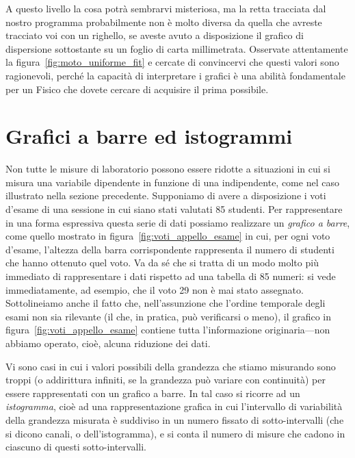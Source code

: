 A questo livello la cosa potrà sembrarvi misteriosa, ma la retta tracciata
dal nostro programma probabilmente non è molto diversa da quella che avreste
tracciato voi con un righello, se aveste avuto a disposizione il grafico di
dispersione sottostante su un foglio di carta millimetrata.
Osservate attentamente la figura~\ref{fig:moto_uniforme_fit} e cercate di
convincervi che questi valori sono ragionevoli, perché la capacità di
interpretare i grafici è una abilità fondamentale per un Fisico che dovete
cercare di acquisire il prima possibile.



\section{Grafici a barre ed istogrammi}
\label{sec:barre_e_istogrammi}

Non tutte le misure di laboratorio possono essere ridotte a situazioni in cui
si misura una variabile dipendente in funzione di una indipendente, come nel
caso illustrato nella sezione precedente. Supponiamo di avere a disposizione
i voti d'esame di una sessione in cui siano stati valutati 85 studenti.
Per rappresentare in una forma espressiva questa serie di dati possiamo
realizzare un \emph{grafico a barre}, come quello mostrato in
figura~\ref{fig:voti_appello_esame} in cui, per ogni voto d'esame, l'altezza
della barra corrispondente rappresenta il numero di studenti che hanno ottenuto
quel voto.
Va da sé che si tratta di un modo molto più immediato di rappresentare i
dati rispetto ad una tabella di 85 numeri: si vede immediatamente, ad esempio,
che il voto 29 non è mai stato assegnato. Sottolineiamo anche il fatto che,
nell'assunzione che l'ordine temporale degli esami non sia rilevante (il che, in
pratica, può verificarsi o meno), il grafico in
figura~\ref{fig:voti_appello_esame} contiene tutta l'informazione
originaria---non abbiamo operato, cioè, alcuna riduzione dei dati.


Vi sono casi in cui i valori possibili della grandezza che stiamo misurando sono
troppi (o addirittura infiniti, se la grandezza può variare con
continuità) per essere rappresentati con un grafico a barre. In tal caso
si ricorre ad un \emph{istogramma}, cioè ad una rappresentazione
grafica in cui l'intervallo di variabilità della grandezza misurata è
suddiviso in un numero fissato di sotto-intervalli (che si dicono canali, o
 dell'istogramma), e si conta il numero di misure che cadono in
ciascuno di questi sotto-intervalli.

